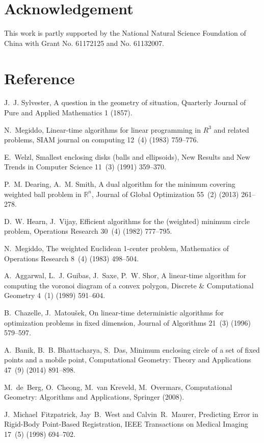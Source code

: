 \documentclass[final,3p,times]{elsarticle}
\begin{document}
\section*{Acknowledgement}
This work is partly supported by the National Natural Science Foundation of China with Grant No. 61172125 and No. 61132007.
\section*{Reference}

%
\begin{thebibliography}{10}
J.~J. Sylvester, {A question in the geometry of situation}, Quarterly Journal
  of Pure and Applied Mathematics 1 (1857).

N.~Megiddo, {Linear-time algorithms for linear programming in $R^{3}$ and
  related problems}, SIAM journal on computing 12~(4) (1983) 759--776.

E.~Welzl, {Smallest
  enclosing disks (balls and ellipsoids)}, New Results and New Trends in
  Computer Science 11~(3) (1991) 359--370.

P.~M. Dearing, A.~M. Smith, {A dual algorithm for the minimum covering weighted
  ball problem in $\mathbb{R}^n$}, Journal of
  Global Optimization 55~(2) (2013) 261--278.

D.~W. Hearn, J.~Vijay, {Efficient algorithms for the (weighted) minimum circle
  problem}, Operations Research 30~(4) (1982) 777--795.

N.~Megiddo, {The weighted Euclidean 1-center problem}, Mathematics of
  Operations Research 8~(4) (1983) 498--504.

A.~Aggarwal, L.~J. Guibas, J.~Saxe, P.~W. Shor, {A linear-time algorithm for
  computing the voronoi diagram of a convex polygon}, Discrete {\&}
  Computational Geometry 4~(1) (1989) 591--604.

B.~Chazelle, J.~Matou{\v{s}}ek, {On linear-time deterministic algorithms for
  optimization problems in fixed dimension}, Journal of Algorithms 21~(3)
  (1996) 579--597.

A.~Banik, B.~B. Bhattacharya, S.~Das,
  {Minimum enclosing circle of a set of fixed points and a mobile point}, Computational Geometry:
  Theory and Applications 47~(9) (2014) 891--898.

M.~de~Berg, O.~Cheong, M.~van Kreveld, M.~Overmars, {Computational Geometry:
  Algorithms and Applications}, Springer (2008).

J.~Michael~Fitzpatrick, Jay~B.~West and Calvin~R.~Maurer, {Predicting Error in Rigid-Body Point-Based Registration}, IEEE Transactions on Medical Imaging 17~(5) (1998) 694--702.
\end{thebibliography}
\end{document}
